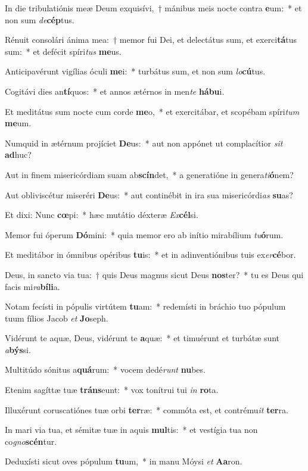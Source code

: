 \item In die tribulatiónis meæ Deum exquisívi,~† mánibus meis nocte contra \textbf{e}um:~* et non sum \textit{de}\textbf{cép}tus.
\item Rénuit consolári ánima mea:~† memor fui Dei, et delectátus sum, et exerci\textbf{tá}tus sum:~* et defécit spíri\textit{tus} \textbf{me}us.
\item Anticipavérunt vigílias óculi \textbf{me}i:~* turbátus sum, et non sum \textit{lo}\textbf{cú}tus.
\item Cogitávi dies an\textbf{tí}quos:~* et annos ætérnos in men\textit{te} \textbf{há}\textbf{bu}i.
\item Et meditátus sum nocte cum corde \textbf{me}o,~* et exercitábar, et scopébam spíri\textit{tum} \textbf{me}um.
\item Numquid in ætérnum projíciet \textbf{De}us:~* aut non appónet ut complacítior \textit{sit} \textbf{ad}huc?
\item Aut in finem misericórdiam suam ab\textbf{scín}det,~* a generatióne in genera\textit{ti}\textbf{ó}nem?
\item Aut obliviscétur miseréri \textbf{De}us:~* aut continébit in ira sua misericórdi\textit{as} \textbf{su}as?
\item Et dixi: Nunc \textbf{cœ}pi:~* hæc mutátio déxteræ \textit{Ex}\textbf{cél}si.
\item Memor fui óperum \textbf{Dó}mini:~* quia memor ero ab inítio mirabílium \textit{tu}\textbf{ó}rum.
\item Et meditábor in ómnibus opéribus \textbf{tu}is:~* et in adinventiónibus tuis ex\textit{er}\textbf{cé}bor.
\item Deus, in sancto via tua:~† quis Deus magnus sicut Deus \textbf{nos}ter?~* tu es Deus qui facis mi\textit{ra}\textbf{bí}\textbf{li}a.
\item Notam fecísti in pópulis virtútem \textbf{tu}am:~* redemísti in bráchio tuo pópulum tuum fílios Jacob \textit{et} \textbf{Jo}seph.
\item Vidérunt te aquæ, Deus, vidérunt te \textbf{a}quæ:~* et timuérunt et turbátæ sunt \textit{a}\textbf{býs}si.
\item Multitúdo sónitus a\textbf{quá}rum:~* vocem dedé\textit{runt} \textbf{nu}bes.
\item Etenim sagíttæ tuæ \textbf{tráns}eunt:~* vox tonítrui tui \textit{in} \textbf{ro}ta.
\item Illuxérunt coruscatiónes tuæ orbi \textbf{ter}ræ:~* commóta est, et contrému\textit{it} \textbf{ter}ra.
\item In mari via tua, et sémitæ tuæ in aquis \textbf{mul}tis:~* et vestígia tua non co\textit{gno}\textbf{scén}tur.
\item Deduxísti sicut oves pópulum \textbf{tu}um,~* in manu Móysi \textit{et} \textbf{A}\textbf{a}ron.
